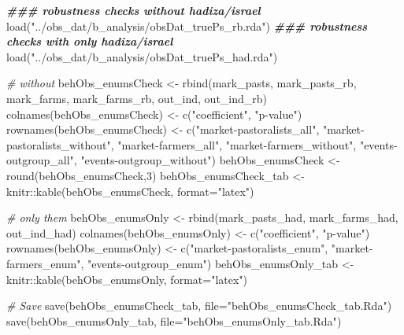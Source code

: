 \documentclass[
]{article}
\newenvironment{Shaded}{\begin{snugshade}}{\end{snugshade}}
\newcommand{\AttributeTok}[1]{\textcolor[rgb]{0.77,0.63,0.00}{#1}}
\newcommand{\CommentTok}[1]{\textcolor[rgb]{0.56,0.35,0.01}{\textit{#1}}}
\newcommand{\DecValTok}[1]{\textcolor[rgb]{0.00,0.00,0.81}{#1}}
\newcommand{\DocumentationTok}[1]{\textcolor[rgb]{0.56,0.35,0.01}{\textbf{\textit{#1}}}}
\newcommand{\FunctionTok}[1]{\textcolor[rgb]{0.00,0.00,0.00}{#1}}
\newcommand{\NormalTok}[1]{#1}
\newcommand{\OtherTok}[1]{\textcolor[rgb]{0.56,0.35,0.01}{#1}}
\newcommand{\SpecialCharTok}[1]{\textcolor[rgb]{0.00,0.00,0.00}{#1}}
\newcommand{\StringTok}[1]{\textcolor[rgb]{0.31,0.60,0.02}{#1}}
\begin{document}
\begin{Shaded}
\begin{Highlighting}[]
\DocumentationTok{\#\#\# robustness checks without hadiza/israel}
\FunctionTok{load}\NormalTok{(}\StringTok{"../obs\_dat/b\_analysis/obsDat\_truePs\_rb.rda"}\NormalTok{)}
\DocumentationTok{\#\#\# robustness checks with only hadiza/israel}
\FunctionTok{load}\NormalTok{(}\StringTok{"../obs\_dat/b\_analysis/obsDat\_truePs\_had.rda"}\NormalTok{)}

\CommentTok{\# without}
\NormalTok{behObs\_enumsCheck }\OtherTok{\textless{}{-}} \FunctionTok{rbind}\NormalTok{(mark\_pasts, mark\_pasts\_rb,}
\NormalTok{                           mark\_farms, mark\_farms\_rb,}
\NormalTok{                           out\_ind, out\_ind\_rb)}
\FunctionTok{colnames}\NormalTok{(behObs\_enumsCheck) }\OtherTok{\textless{}{-}} \FunctionTok{c}\NormalTok{(}\StringTok{"coefficient"}\NormalTok{, }\StringTok{"p{-}value"}\NormalTok{)}
\FunctionTok{rownames}\NormalTok{(behObs\_enumsCheck) }\OtherTok{\textless{}{-}} \FunctionTok{c}\NormalTok{(}\StringTok{"market{-}pastoralists\_all"}\NormalTok{,}
                                 \StringTok{"market{-}pastoralists\_without"}\NormalTok{,}
                                 \StringTok{"market{-}farmers\_all"}\NormalTok{,}
                                 \StringTok{"market{-}farmers\_without"}\NormalTok{,}
                                 \StringTok{"events{-}outgroup\_all"}\NormalTok{,}
                                 \StringTok{"events{-}outgroup\_without"}\NormalTok{)}
\NormalTok{behObs\_enumsCheck }\OtherTok{\textless{}{-}} \FunctionTok{round}\NormalTok{(behObs\_enumsCheck,}\DecValTok{3}\NormalTok{)}
\NormalTok{behObs\_enumsCheck\_tab }\OtherTok{\textless{}{-}}\NormalTok{ knitr}\SpecialCharTok{::}\FunctionTok{kable}\NormalTok{(behObs\_enumsCheck, }\AttributeTok{format=}\StringTok{"latex"}\NormalTok{)}

\CommentTok{\# only them}
\NormalTok{behObs\_enumsOnly }\OtherTok{\textless{}{-}} \FunctionTok{rbind}\NormalTok{(mark\_pasts\_had, mark\_farms\_had, out\_ind\_had)}
\FunctionTok{colnames}\NormalTok{(behObs\_enumsOnly) }\OtherTok{\textless{}{-}} \FunctionTok{c}\NormalTok{(}\StringTok{"coefficient"}\NormalTok{, }\StringTok{"p{-}value"}\NormalTok{)}
\FunctionTok{rownames}\NormalTok{(behObs\_enumsOnly) }\OtherTok{\textless{}{-}} \FunctionTok{c}\NormalTok{(}\StringTok{"market{-}pastoralists\_enum"}\NormalTok{,}
                                 \StringTok{"market{-}farmers\_enum"}\NormalTok{,}
                                 \StringTok{"events{-}outgroup\_enum"}\NormalTok{)}
\NormalTok{behObs\_enumsOnly\_tab }\OtherTok{\textless{}{-}}\NormalTok{ knitr}\SpecialCharTok{::}\FunctionTok{kable}\NormalTok{(behObs\_enumsOnly, }\AttributeTok{format=}\StringTok{"latex"}\NormalTok{)}

\CommentTok{\# Save}
\FunctionTok{save}\NormalTok{(behObs\_enumsCheck\_tab, }\AttributeTok{file=}\StringTok{"behObs\_enumsCheck\_tab.Rda"}\NormalTok{)}
\FunctionTok{save}\NormalTok{(behObs\_enumsOnly\_tab, }\AttributeTok{file=}\StringTok{"behObs\_enumsOnly\_tab.Rda"}\NormalTok{)}
\end{Highlighting}
\end{Shaded}
\end{document}
